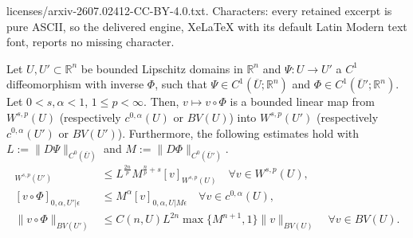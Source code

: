\documentclass[10pt,a4paper]{amsart}
\newcommand{\R}{\mathbb{R}}
\begin{document}
licenses/arxiv-2607.02412-CC-BY-4.0.txt. Characters: every retained excerpt is pure ASCII, so the delivered engine, XeLaTeX with its default Latin Modern text font, reports no missing character.
    \begin{lemma} \label{lemma:comp_diffeo_wsp}
    Let $U, U' \subset \R^n$ be bounded Lipschitz domains in $\R^n$ and $\Psi:  U \to U'$ a $C^1$ diffeomorphism with inverse $\Phi$, such that $\Psi \in C^1(\overline U;\R^n)$ and $\Phi \in C^1(\overline U';\R^n)$. Let $0< s,\alpha < 1$, $1 \le p < \infty$. Then, $v \mapsto v \circ \Phi$ is a bounded linear map from $W^{s,p}(U)$ (respectively $c^{0,\alpha}(U)$ or $BV(U)$) into $W^{s,p}(U')$ (respectively $c^{0,\alpha}(U')$ or $BV(U')$). Furthermore, the following estimates hold with $L := \|D\Psi\|_{C^0(\overline U)}$ and $M := \|D\Phi\|_{C^0(\overline U')}$.
    \begin{align}
        [v\circ \Phi]_{W^{s,p}(U')} &\leq L^{\frac{2n}p} M^{\frac{n}{p}+s} [v]_{W^{s,p}(U)} \quad \forall v \in W^{s,p}(U), \label{eq:frac_Sob_diffeo}\\
        [v \circ \Phi]_{0,\alpha, U'| \epsilon} &\leq M^\alpha [v]_{0,\alpha,U|M\epsilon} \quad \forall v \in c^{0,\alpha}(U),\\
        \|v \circ \Phi\|_{BV(U')} &\leq C(n,U) L^{2n} \max \{M^{n+1}, 1\} \|v\|_{BV(U)} \label{eq:BV_est_for_v_circ_Phi} \quad \forall v \in BV(U).
    \end{align}
    \end{lemma}
\end{document}
